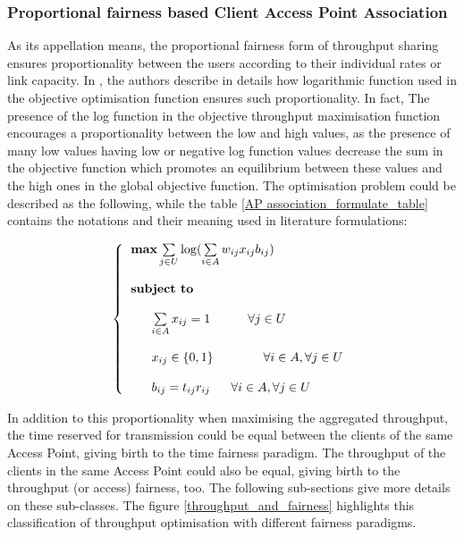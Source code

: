 \documentclass[journal,transmag]{IEEEtran}
\begin{document}
\subsubsection{Proportional fairness based Client Access Point Association} 
As its appellation means, the proportional fairness form of throughput sharing ensures proportionality between the users according to their individual rates or link capacity.
In \cite{97kelly_elastic_rate}, the authors describe in details how logarithmic function used in the objective optimisation function ensures such proportionality. In fact, The presence of the log function in the objective throughput maximisation function encourages a proportionality between the low and high values, as the presence of many low values having low or negative log function values decrease the sum in the objective function which promotes an equilibrium between these values and the high ones in the global objective function. The optimisation problem could be described as the following, while the table \ref{AP association_formulate_table} contains the notations and their meaning used in literature formulations:

\begin{footnotesize}
\begin{equation}
\left\{
\begin{tabular}{l}
$\textbf{max}  \sum\limits_{j \in U} \log ( \sum\limits_{i \in A} w_{ij} x_{ij} b_{ij}) $ \\         
\\
\textbf{subject to} \\
\\
~~~~~$ \sum\limits_{i \in A} x_{ij} = 1 ~~~~~~~~~ \forall j \in U $ \\ 

\\
~~~~~$ x_{ij} \in \{0,1\} ~~~~~~~~~~~~ \forall i \in A, \forall j \in U $ \\

\\
~~~~~$ b_{ij} = t_{ij} r_{ij}$ ~~~ $\forall i \in A, \forall j \in U $  \\


\end{tabular}
\right.
\end{equation}
\end{footnotesize}


In addition to this proportionality when maximising the aggregated throughput, the time reserved for transmission could be equal between the clients of the same Access Point, giving birth to the time fairness paradigm. The throughput of the clients in the same Access Point could also be equal, giving birth to the throughput (or access) fairness, too. The following sub-sections give more details on these sub-classes. The figure \ref{throughput_and_fairness} highlights this classification of throughput optimisation with different fairness paradigms.
\end{document}
